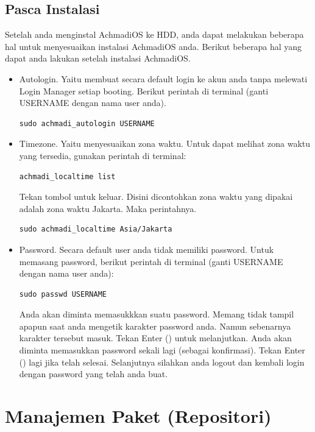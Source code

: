\documentclass[12pt,]{article}
\begin{document}
	\newpage	
	\subsection{Pasca Instalasi}
	
	Setelah anda menginstal AchmadiOS ke HDD, anda dapat melakukan beberapa hal untuk menyesuaikan instalasi AchmadiOS anda.
	Berikut beberapa hal yang dapat anda lakukan setelah instalasi AchmadiOS.
	\begin{itemize}
		\item Autologin. Yaitu membuat secara default login ke akun anda tanpa melewati Login Manager setiap booting.
		Berikut perintah di terminal (ganti USERNAME dengan nama user anda).
		\begin{verbatim}
sudo achmadi_autologin USERNAME
		\end{verbatim}
		
		\item Timezone. Yaitu menyesuaikan zona waktu.
		Untuk dapat melihat zona waktu yang tersedia, gunakan perintah di terminal:
		\begin{verbatim}
achmadi_localtime list
		\end{verbatim}
		Tekan tombol  untuk keluar.
		Disini dicontohkan zona waktu yang dipakai adalah zona waktu Jakarta.
		Maka perintahnya.
		\begin{verbatim}
sudo achmadi_localtime Asia/Jakarta
		\end{verbatim}
		
		\item Password. Secara default user anda tidak memiliki password.
		Untuk memasang password, berikut perintah di terminal (ganti USERNAME dengan nama user anda):
		\begin{verbatim}
sudo passwd USERNAME
		\end{verbatim}
		Anda akan diminta memasukkkan suatu password.
		Memang tidak tampil apapun saat anda mengetik karakter password anda.
		Namun sebenarnya karakter tersebut masuk.
		Tekan Enter (\keys{\return}) untuk melanjutkan.
		Anda akan diminta memasukkan password sekali lagi (sebagai konfirmasi).
		Tekan Enter (\keys{\return}) lagi jika telah selesai.
		Selanjutnya silahkan anda logout dan kembali login dengan password yang telah anda buat.
	\end{itemize}

	\newpage
	\section{Manajemen Paket (Repositori)}
	
\end{document}
